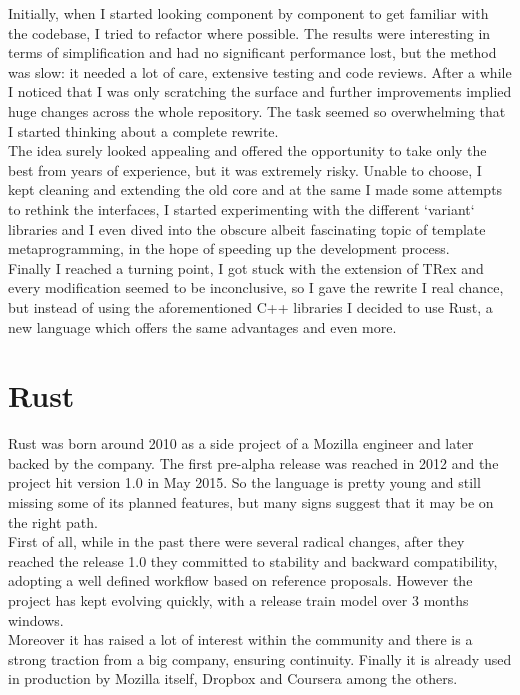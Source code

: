 Initially, when I started looking component by component to get familiar with the codebase, I tried to refactor where possible. The results were interesting in terms of simplification and had no significant performance lost, but the method was slow: it needed a lot of care, extensive testing and code reviews. After a while I noticed that I was only scratching the surface and further improvements implied huge changes across the whole repository. The task seemed so overwhelming that I started thinking about a complete rewrite.\\
The idea surely looked appealing and offered the opportunity to take only the best from years of experience, but it was extremely risky. Unable to choose, I kept cleaning and extending the old core and at the same I made some attempts to rethink the interfaces, I started experimenting with the different `variant` libraries and I even dived into the obscure albeit fascinating topic of template metaprogramming, in the hope of speeding up the development process.\\
Finally I reached a turning point, I got stuck with the extension of TRex and every modification seemed to be inconclusive, so I gave the rewrite I real chance, but instead of using the aforementioned C++ libraries I decided to use Rust, a new language which offers the same advantages and even more. 

\section{Rust}
Rust was born around 2010 as a side project of a Mozilla engineer and later backed by the company. The first pre-alpha release was reached in 2012 and the project hit version 1.0 in May 2015. So the language is pretty young and still missing some of its planned features, but many signs suggest that it may be on the right path.\\
First of all, while in the past there were several radical changes, after they reached the release 1.0 they committed to stability and backward compatibility, adopting a well defined workflow based on reference proposals. However the project has kept evolving quickly, with a release train model over 3 months windows.\\
Moreover it has raised a lot of interest within the community and there is a strong traction from a big company, ensuring continuity. Finally it is already used in production by Mozilla itself, Dropbox and Coursera among the others.

